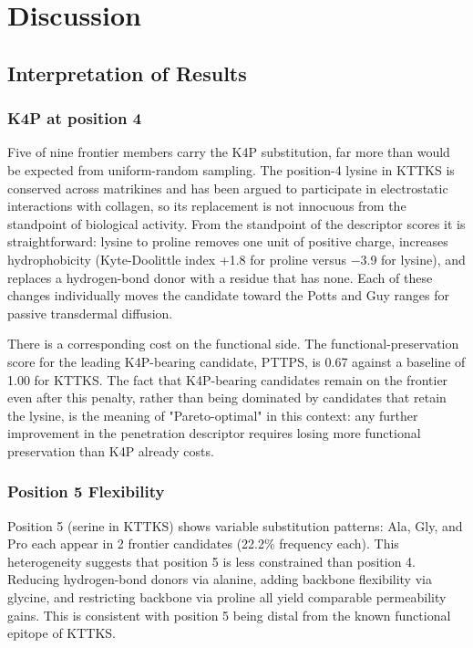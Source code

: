 \documentclass[11pt,letterpaper]{article}
\begin{document}
\section{Discussion}

\subsection{Interpretation of Results}

\subsubsection{K4P at position 4}

Five of nine frontier members carry the K4P substitution, far more than would be expected from uniform-random sampling. The position-4 lysine in KTTKS is conserved across matrikines and has been argued to participate in electrostatic interactions with collagen\cite{katayama1993}, so its replacement is not innocuous from the standpoint of biological activity. From the standpoint of the descriptor scores it is straightforward: lysine to proline removes one unit of positive charge, increases hydrophobicity (Kyte-Doolittle index +1.8 for proline versus $-$3.9 for lysine), and replaces a hydrogen-bond donor with a residue that has none. Each of these changes individually moves the candidate toward the Potts and Guy ranges for passive transdermal diffusion.

There is a corresponding cost on the functional side. The functional-preservation score for the leading K4P-bearing candidate, PTTPS, is 0.67 against a baseline of 1.00 for KTTKS. The fact that K4P-bearing candidates remain on the frontier even after this penalty, rather than being dominated by candidates that retain the lysine, is the meaning of "Pareto-optimal" in this context: any further improvement in the penetration descriptor requires losing more functional preservation than K4P already costs.

\subsubsection{Position 5 Flexibility}

Position 5 (serine in KTTKS) shows variable substitution patterns: Ala, Gly, and Pro each appear in 2 frontier candidates (22.2\% frequency each). This heterogeneity suggests that position 5 is less constrained than position 4. Reducing hydrogen-bond donors via alanine, adding backbone flexibility via glycine, and restricting backbone via proline all yield comparable permeability gains. This is consistent with position 5 being distal from the known functional epitope of KTTKS.
\end{document}
